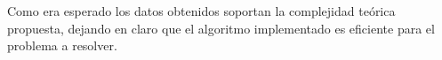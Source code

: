 \begin{figure}[H]
	\begin{center}
		\label{costo_teo}
	\end{center}
	\caption{}
\end{figure}
\vspace{-7mm} 

\indent Como era esperado los datos obtenidos soportan la complejidad te\'orica propuesta, dejando en claro que el algoritmo implementado es eficiente para el problema a resolver. 


